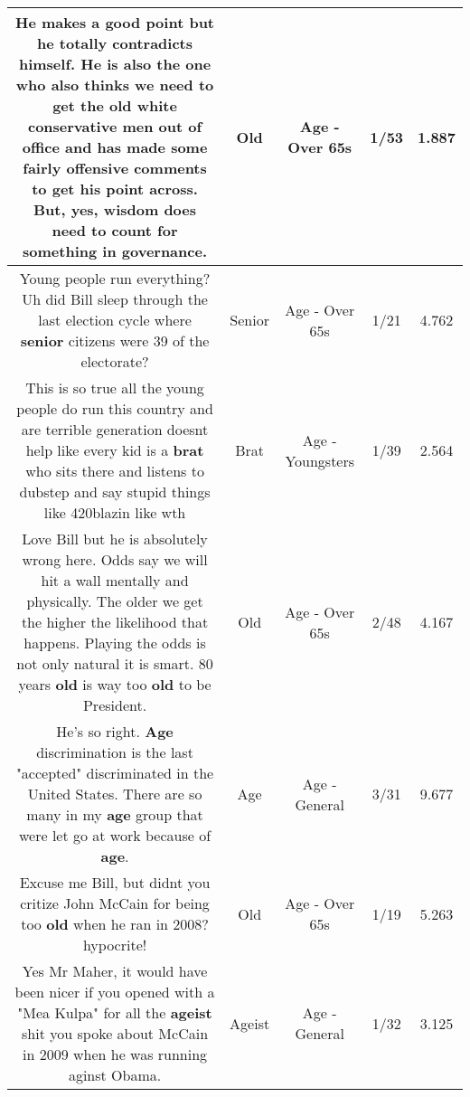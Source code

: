 \documentclass[11pt]{article}
\newlength\mylength
\begin{document}
\begin{center}
\begin{longtable}{|C{.65\mylength}|C{.30\mylength}|C{.12\mylength}|C{.12\mylength}|C{.12\mylength}|}
  \small He makes a good point but he totally contradicts himself. He is also the one who also thinks we need to get the \textbf{old} white conservative men out of office and has made some fairly offensive comments to get his point across. But, yes, wisdom does need to count for something in governance.\normalsize   & Old & Age - Over 65s & 1/53 & 1.887 \\  \hline
  \small Young people run everything? Uh did Bill sleep through the last election cycle where \textbf{senior} citizens were 39 of the electorate?\normalsize   & Senior & Age - Over 65s & 1/21 & 4.762 \\  \hline
  \small This is so true all the young people do run this country and are terrible generation doesnt help like every kid is a \textbf{brat} who sits there and listens to dubstep and say stupid things like 420blazin like wth\normalsize   & Brat & Age - Youngsters & 1/39 & 2.564 \\  \hline
  \small Love Bill but he is absolutely wrong here. Odds say we will hit a wall mentally and physically. The older we get the higher the likelihood that happens. Playing the odds is not only natural it is smart. 80 years \textbf{old} is way too \textbf{old} to be President.\normalsize   & Old & Age - Over 65s & 2/48 & 4.167 \\  \hline
  \small He's so right. \textbf{Age} discrimination is the last "accepted" discriminated in the United States. There are so many in my \textbf{age} group that were let go at work because of \textbf{age}.\normalsize   & Age & Age - General & 3/31 & 9.677 \\  \hline
  \small Excuse me Bill, but didnt you critize John McCain for being too \textbf{old} when he ran in 2008? hypocrite!\normalsize   & Old & Age - Over 65s & 1/19 & 5.263 \\  \hline
  \small Yes Mr Maher, it would have been nicer if you opened with a "Mea Kulpa" for all the \textbf{ageist} shit you spoke about McCain in 2009 when he was running aginst Obama.\normalsize   & Ageist & Age - General & 1/32 & 3.125 \\  \hline

\end{longtable}
\end{center}
\end{document}
